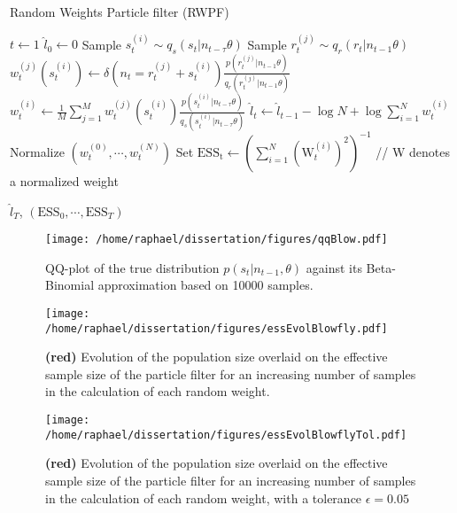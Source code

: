 \documentclass[12pt]{article}
\begin{document}
	\begin{algorithm}
		\caption{Random Weights Particle filter (RWPF)}\label{RWPF}
		\begin{algorithmic}[1]
			\State $t \gets 1$
			\State $\hat{l}_0 \gets 0$
			\State Sample $s_t^{(i)} \sim q_s(s_t| n_{t-\tau} \theta)$
			\State Sample $r_t^{(j)} \sim q_r(r_t| n_{t-1} \theta)$
			\State $w_t^{(j)}(s_t^{(i)}) \gets \delta(n_t=r_t^{(j)}+s_t^{(i)})\frac{p(r_t^{(j)}| n_{t-1} \theta)}{q_r(r_t^{(j)}| n_{t-1} \theta)}$
			\EndFor
			\State $w_t^{(i)} \gets \frac{1}{M}\sum_{j=1}^{M}w_t^{(j)}(s_t^{(i)}) \frac{p(s_t^{(i)}| n_{t-\tau} \theta)}{q_s(s_t^{(i)}| n_{t-\tau} \theta)}$
			\EndFor
			\State $\hat{l}_t \gets \hat{l}_{t-1} - \log N + \log\sum_{i=1}^{N}w_t^{(i)}$
			\State Normalize $(w_t^{(0)}, \cdots, w_t^{(N)})$
			\State Set $\mathrm{ESS_t} \gets (\sum_{i=1}^{N}(\mathrm{W}_t^{(i)})^2)^{-1}$ // W denotes a normalized weight
			\EndWhile
			\item[]
			\Return $\hat{l}_T$,  $(\mathrm{ESS}_0, \cdots, \mathrm{ESS}_T)$
			\EndFunction
		\end{algorithmic}
	\end{algorithm}

	\begin{figure}[htb]
		\centering
		\begin{minipage}{0.5\textwidth}
			\centering
			\texttt{[image: /home/raphael/dissertation/figures/qqBlow.pdf]}
		\end{minipage}
		\caption{QQ-plot of the true distribution $p(s_t | n_{t-1}, \theta)$ against its Beta-Binomial approximation based on 10000 samples.}
		\label{fig:qqBlow}
	\end{figure}

	\begin{figure}[htb]
		\centering
		\begin{minipage}{0.9\textwidth}
			\centering
			\texttt{[image: /home/raphael/dissertation/figures/essEvolBlowfly.pdf]}
		\end{minipage}
		\caption{\textbf{(red)} Evolution of the population size overlaid on the effective sample size of the particle filter for an increasing number of samples in the calculation of each random weight.}
		\label{fig:essBlow}
	\end{figure}

	\begin{figure}[htb]
		\centering
		\begin{minipage}{0.9\textwidth}
			\centering
			\texttt{[image: /home/raphael/dissertation/figures/essEvolBlowflyTol.pdf]}
		\end{minipage}
		\caption{\textbf{(red)} Evolution of the population size overlaid on the effective sample size of the particle filter for an increasing number of samples in the calculation of each random weight, with a tolerance $\epsilon=0.05$}
		\label{fig:essBlowTol}
	\end{figure}
	
\end{document}
